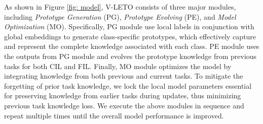 As shown in Figure \ref{fig: model}, V-LETO consists of three major modules, including {\em Prototype Generation} (PG), {\em Prototype Evolving} (PE), and {\em Model Optimization} (MO).
Specifically, PG module use local labels in conjunction with global embeddings to generate class-specific prototypes, which  effectively capture and represent the complete knowledge associated with each class. 
PE module uses the outputs from PG module and evolves the prototype knowledge from previous tasks for both CIL and FIL.
Finally, MO module optimizes the model by integrating knowledge from both previous and current tasks. %
To mitigate the forgetting of prior task knowledge, we lock the local model parameters essential for preserving knowledge from earlier tasks during updates, thus minimizing previous task knowledge loss.
We execute the above modules in sequence and repeat multiple times until the overall model performance is improved.

